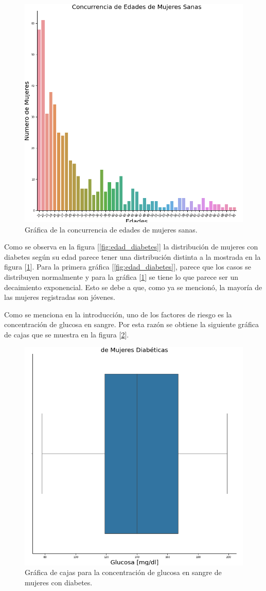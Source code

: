 \documentclass{article}
\begin{document}
\begin{figure}[H]
	\centering
	\includegraphics[width=0.65\linewidth]{edad_no_diabetes.png}
	\caption{Gráfica de la concurrencia de edades de mujeres sanas.}%
	\label{fig:edad_no_diabetes}
\end{figure}

Como se observa en la figura [\ref{fig:edad_diabetes}] la distribución de mujeres con diabetes según su edad parece tener una distribución distinta a la mostrada en la figura [\ref{fig:edad_no_diabetes}]. Para la primera gráfica [\ref{fig:edad_diabetes}], parece que los casos se distribuyen normalmente\cite{Distro_normal} y para la gráfica [\ref{fig:edad_no_diabetes}] se tiene lo que parece ser un decaimiento exponencial. Esto se debe a que, como ya se mencionó, la mayoría de las mujeres registradas son jóvenes.

Como se menciona en la introducción, uno de los factores de riesgo es la concentración de glucosa en sangre. Por esta razón se obtiene la siguiente gráfica de cajas que se muestra en la figura  [\ref{fig:glucosa_diabetes}].

\begin{figure}[H]
	\centering
	\includegraphics[width=0.65\linewidth]{glucosa_diabetes.png}
	\caption{Gráfica de cajas para la concentración de glucosa en sangre de mujeres con diabetes.}%
	\label{fig:glucosa_diabetes}
\end{figure}
\end{document}
